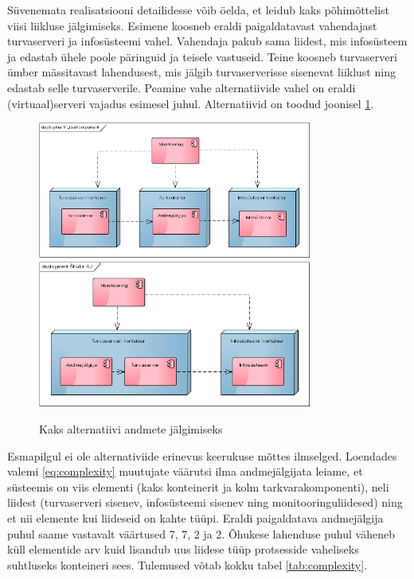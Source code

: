 \documentclass{tufte-book}
\begin{document}
Süvenemata realisatsiooni detailidesse võib öelda, et leidub kaks põhimõttelist viisi liikluse jälgimiseks. Esimene koosneb eraldi paigaldatavast vahendajast turvaserveri ja infosüsteemi vahel. Vahendaja pakub sama liidest, mis infosüsteem ja edastab ühele poole päringuid ja teisele vastuseid. Teine koosneb turvaserveri ümber mässitavast lahendusest, mis jälgib turvaserverisse sisenevat liiklust ning edastab selle turvaserverile. Peamine vahe alternatiivide vahel on eraldi (virtuaal)serveri vajadus esimesel juhul. Alternatiivid on toodud joonisel \ref{fig:complexity:added}.


\begin{figure}[htp]
		\includegraphics[width=9cm]{lisakomponent.png}
		\includegraphics[width=9cm]{ohuke.png}
		\caption{Kaks alternatiivi andmete jälgimiseks}
		\label{fig:complexity:added}
\end{figure}

Esmapilgul ei ole alternativiide erinevus keerukuse mõttes ilmselged. Loendades valemi \ref{eq:complexity} muutujate väärutsi ilma andmejälgijata leiame, et süsteemis on viis elementi (kaks konteinerit ja kolm tarkvarakomponenti), neli liidest (turvaserveri sisenev, infosüsteemi sisenev ning monitooringuliidesed) ning et nii elemente kui liideseid on kahte tüüpi. Eraldi paigaldatava andmejälgija puhul saame vastavalt väärtused 7, 7, 2 ja 2. Õhukese lahenduse puhul väheneb küll elementide arv kuid lisandub uus liidese tüüp protsesside vaheliseks suhtluseks konteineri sees. Tulemused võtab kokku tabel \ref{tab:complexity}. 
\end{document}
